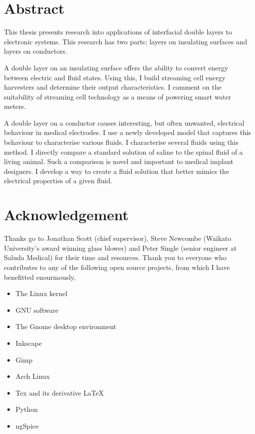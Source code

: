 





\rmfamily
\tableofcontents{}
\listoffigures
\listoftables
\printnomenclature{}
\doublespacing

\chapter*{Abstract}
This thesis presents research into applications of interfacial double layers to electronic systems.
This research has two parts; layers on insulating surfaces and layers on conductors.

A double layer on an insulating surface offers the ability to convert energy between electric and fluid states.
Using this, I build streaming cell energy harvesters and determine their output characteristics.
I comment on the suitability of streaming cell technology as a means of powering smart water meters.

A double layer on a conductor causes interesting, but often unwanted, electrical behaviour in medical electrodes.
I use a newly developed model that captures this behaviour to characterise various fluids.
I characterise several fluids using this method.
I directly compare a standard solution of saline to the spinal fluid of a living animal.
Such a comparison is novel and important to medical implant designers.
I develop a way to create a fluid solution that better mimics the electrical properties of a given fluid.


\chapter*{Acknowledgement}
Thanks go to Jonathan Scott (chief supervisor), Steve Newcombe (Waikato University's award winning glass blower) and Peter Single (senior engineer at Saluda Medical) for their time and resources.
Thank you to everyone who contributes to any of the following open source projects, from which I have benefitted enourmously,
\begin{itemize}
\item The Linux kernel
\item GNU software
\item The Gnome desktop environment
\item Inkscape
\item Gimp
\item Arch Linux
\item Tex and its derivative \LaTeX
\item Python
\item ngSpice
\end{itemize}

